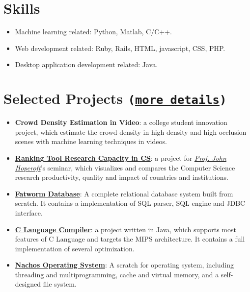 \documentclass[letterpaper]{article}
\begin{document}
\section*{Skills}
\begin{itemize}
\item Machine learning related: Python, Matlab, C/C++.
\item Web development related: Ruby, Rails, HTML, javascript, CSS, PHP.
\item Desktop application development related: Java.
\end{itemize}
\section*{Selected Projects \normalsize{\tt(\href{https://github.com/lostleaf?tab=repositories}{more details})}}
\begin{itemize}
\item \textbf{Crowd Density Estimation in Video}:
a college student innovation project, which estimate the crowd density in high density and high occlusion scenes with machine learning techniques in videos.
\item \textbf{\href{http://acm.sjtu.edu.cn/ricsrt/}{Ranking Tool Research Capacity in CS}}:
a project for \emph{\href{http://www.cs.cornell.edu/jeh/}{Prof. John Hopcroft}}'s seminar, which visualizes and compares the Computer Science research productivity, quality and impact of countries and institutions.
\item \textbf{\href{https://github.com/lostleaf/fatworm}{Fatworm Database}}:
A complete relational database system built from scratch. It contains a implementation of SQL parser, SQL engine and JDBC interface.
\item \textbf{\href{https://github.com/lostleaf/compiler}{C Language Compiler}}:
a project written in Java, which supports most features of C Language and targets the MIPS architecture. It contains a full implementation of several optimization.
\item \textbf{\href{https://github.com/lostleaf/nachos}{Nachos Operating System}}: 
A scratch for operating system, including threading and multiprogramming, cache and virtual memory, and a self-designed file system.
\end{itemize}
\end{document}
